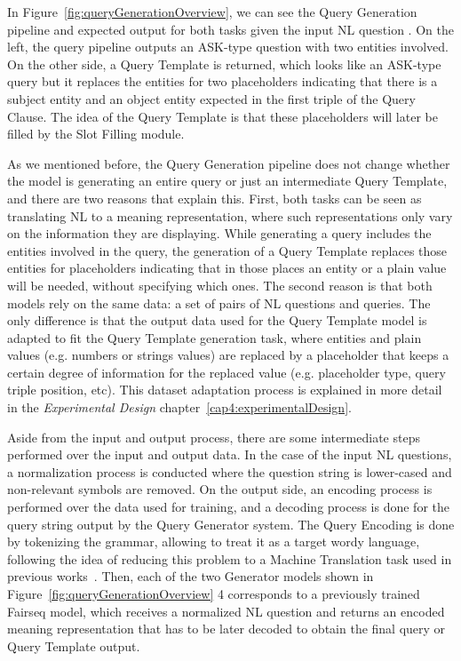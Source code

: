 In Figure~\ref{fig:queryGenerationOverview}, we can see the Query Generation pipeline and 
expected output for both tasks given the input NL question . On the left, the \SPARQL{} query pipeline outputs an ASK-type \SPARQL{} question with two 
entities involved. On the other side, a Query Template is returned, which looks like an 
ASK-type \SPARQL{} query but it replaces the entities for two placeholders indicating that there 
is a subject entity and an object entity expected in the first triple of the Query Clause. 
The idea of the Query Template is that these placeholders will later be filled by the Slot 
Filling module.

As we mentioned before, the Query Generation pipeline does not change whether the model is 
generating an entire \SPARQL{} query or just an intermediate Query Template, and there are two 
reasons that explain this. First, both tasks can be seen as translating NL to a meaning 
representation, where such representations only vary on the information they are displaying. 
While generating a \SPARQL{} query includes the entities involved in the query, the generation 
of a Query Template replaces those entities for placeholders indicating that in those places 
an entity or a plain value will be needed, without specifying which ones. The second reason 
is that both models rely on the same data: a set of pairs of NL questions and \SPARQL{} queries. 
The only difference is that the output data used for the Query Template model is adapted to 
fit the Query Template generation task, where entities and plain values (e.g. numbers or 
strings values) are replaced by a placeholder that keeps a certain degree of information for 
the replaced value (e.g. placeholder type, query triple position, etc). This dataset 
adaptation process is explained in more detail in the \textit{Experimental Design} chapter~\ref{cap4:experimentalDesign}.

Aside from the input and output process, there are some intermediate steps performed over the 
input and output data. In the case of the input NL questions, a normalization process is 
conducted where the question string is lower-cased and non-relevant symbols are removed. On 
the output side, an encoding process is performed over the data used for training, and a 
decoding process is done for the query string output by the Query Generator system. The Query 
Encoding is done by tokenizing the \SPARQL{} grammar, allowing to treat it as a target wordy 
language, following the idea of reducing this problem to a Machine Translation task used in 
previous works~\cite{semPar:ChoMGBBSB14, semPar:sempar-as-mt-AndreasVC13, nmt:nl-to-sparql-Yin19}. 
Then, each of the two Generator models shown in Figure~\ref{fig:queryGenerationOverview} 4 
corresponds to a previously trained Fairseq model, which receives a normalized NL question 
and returns an encoded meaning representation that has to be later decoded to obtain the 
final \SPARQL{} query or Query Template output.

